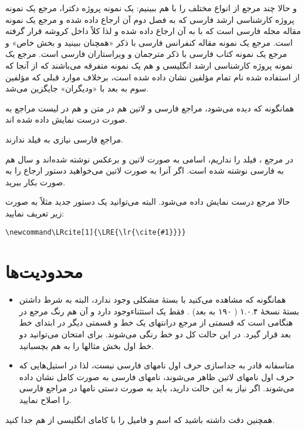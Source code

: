 \documentclass{article}
\begin{document}
و حالا چند مرجع از انواع مختلف  را با هم ببینیم:  \cite{Omidali82phdThesis} یک نمونه پروژه دکترا، مرجع \cite[فصل ۲]{Pourmousa88mscThesis} یک نمونه پروژه کارشناسی ارشد فارسی که به فصل دوم آن ارجاع داده شده و  مرجع \citep{Abadi87} یک نمونه مقاله مجله فارسی است که با  به آن ارجاع داده شده و لذا کلاً داخل کروشه قرار گرفته است.
 مرجع \cite[همچنین ببینید][بخش ۲]{Amintoosi87afzayesh}  یک نمونه  مقاله کنفرانس فارسی با ذکر «همچنان ببینید و بخش خاص» و مرجع \cite{Pedram80osool} یک نمونه کتاب فارسی با ذکر مترجمان و ویراستاران فارسی است. مرجع \cite{Khalighi07MscThesis}
 یک نمونه پروژه کارشناسی ارشد انگلیسی و \citealp*{Khalighi87xepersian} هم یک نمونه متفرقه  می‌باشند 
که از آنجا که از   استفاده شده نام تمام مؤلفین نشان داده شده است، برخلاف موارد قبلی که مؤلفین سوم به بعد با «ودیگران» جایگزین می‌شد. 

همانگونه که دیده می‌شود، مراجع فارسی و لاتین هم در متن و هم در لیست مراجع به صورت درست نمایش داده شده اند. 

مراجع فارسی نیازی به فیلد  ندارند.

در مرجع \cite{Baker02limits}،  فیلد  را نداریم، اسامی به صورت لاتین و برعکس نوشته شده‌اند و سال هم به فارسی نوشته شده است. اگر آنرا به صورت لاتین می‌خواهید دستور ارجاع را به صورت  بکار ببرید.

 حالا مرجع  درست نمایش داده می‌شود. البته می‌توانید یک دستور جدید مثلاً به صورت زیر تعریف نمایید:
\begin{latin}
\begin{verbatim}
‎\newcommand\LRcite[1]{\LRE{\lr{\cite{#1}}}}
\end{verbatim}
\end{latin}

\section{محدودیت‌ها}
\begin{itemize}
\item همانگونه که مشاهده می‌کنید با بستهٔ  مشکلی وجود ندارد، البته به شرط داشتن بستهٔ نسخهٔ ۱.۰.۴ ( ۱۹۰ به بعد) . فقط یک استثناءوجود دارد و آن هم رنگ مرجع در هنگامی است که  قسمتی از مرجع درانتهای یک خط و قسمتی دیگر در ابتدای خط بعد قرار گیرد. در این حالت کل دو خط رنگی می‌شوند. برای امتحان می‌توانید دو خط اول بخش مثالها را به هم بچسبانید.
\item متاسفانه  قادر به جداسازی حرف اول نامهای فارسی نیست، لذا در استیل‌‌هایی که حرف اول نامهای لاتین ظاهر می‌شوند، نامهای فارسی به صورت کامل نشان داده می‌شوند. اگر نیاز به این حالت دارید، باید به صورت دستی نامها در مراجع فارسی را اصلاح نمایید.
\end{itemize}
همچنین دقت داشته باشید که اسم و فامیل را با کامای انگلیسی از هم جدا کنید.
\end{document}
